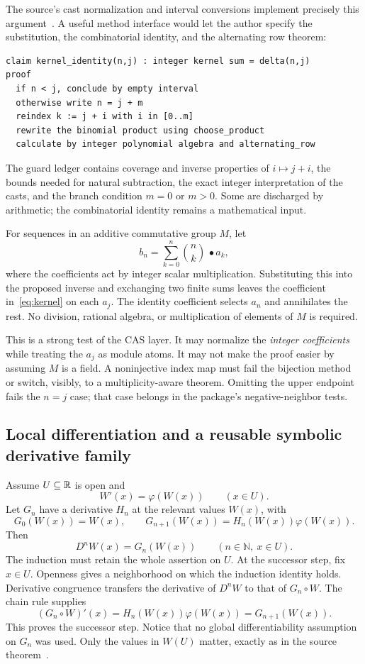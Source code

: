 \documentclass[11pt,a4paper]{article}
\newcommand{\N}{\mathbb N}\newcommand{\Z}{\mathbb Z}
\theoremstyle{remark}\newtheorem{example}[proposition]{Example}
\begin{document}
The source's cast normalization and interval conversions implement precisely this argument~\cite{binomial}. A useful method interface would let the author specify the substitution, the combinatorial identity, and the alternating row theorem:
\begin{lstlisting}
claim kernel_identity(n,j) : integer kernel sum = delta(n,j)
proof
  if n < j, conclude by empty interval
  otherwise write n = j + m
  reindex k := j + i with i in [0..m]
  rewrite the binomial product using choose_product
  calculate by integer polynomial algebra and alternating_row
\end{lstlisting}
The guard ledger contains coverage and inverse properties of $i\mapsto j+i$, the bounds needed for natural subtraction, the exact integer interpretation of the casts, and the branch condition $m=0$ or $m>0$. Some are discharged by arithmetic; the combinatorial identity remains a mathematical input.

For sequences in an additive commutative group $M$, let
\[
 b_n=\sum_{k=0}^{n}\binom nk\,\mathbin{\bullet}a_k,
\]
where the coefficients act by integer scalar multiplication. Substituting this into the proposed inverse and exchanging two finite sums leaves the coefficient in~\eqref{eq:kernel} on each $a_j$. The identity coefficient selects $a_n$ and annihilates the rest. No division, rational algebra, or multiplication of elements of $M$ is required.

This is a strong test of the CAS layer. It may normalize the \emph{integer coefficients} while treating the $a_j$ as module atoms. It may not make the proof easier by assuming $M$ is a field. A noninjective index map must fail the bijection method or switch, visibly, to a multiplicity-aware theorem. Omitting the upper endpoint fails the $n=j$ case; that case belongs in the package's negative-neighbor tests.

\subsection{Local differentiation and a reusable symbolic derivative family}\label{sec:odecase}
Assume $U\subseteq\mathbb R$ is open and
\[
 W'(x)=\varphi(W(x))\qquad(x\in U).
\]
Let $G_n$ have a derivative $H_n$ at the relevant values $W(x)$, with
\[
 G_0(W(x))=W(x),\qquad
 G_{n+1}(W(x))=H_n(W(x))\varphi(W(x)).
\]
Then
\begin{equation}\label{eq:ode}
 D^nW(x)=G_n(W(x))\qquad(n\in\N,\ x\in U).
\end{equation}
The induction must retain the whole assertion on $U$. At the successor step, fix $x\in U$. Openness gives a neighborhood on which the induction identity holds. Derivative congruence transfers the derivative of $D^nW$ to that of $G_n\circ W$. The chain rule supplies
\[
 (G_n\circ W)'(x)=H_n(W(x))\varphi(W(x))=G_{n+1}(W(x)).
\]
This proves the successor step. Notice that no global differentiability assumption on $G_n$ was used. Only the values in $W(U)$ matter, exactly as in the source theorem~\cite{ode}.
\end{document}
